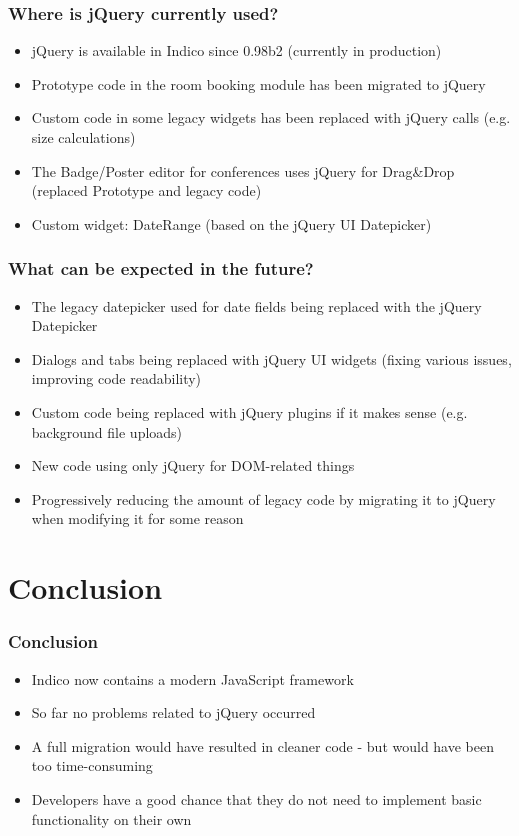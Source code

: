 \documentclass{beamer}
\begin{document}
\begin{frame}
  \frametitle{Where is jQuery currently used?}
  \begin{itemize}
    \item jQuery is available in Indico since 0.98b2 (currently in production)
    \item Prototype code in the room booking module has been migrated to jQuery
    \item Custom code in some legacy widgets has been replaced with jQuery calls (e.g. size calculations)
    \item The Badge/Poster editor for conferences uses jQuery for Drag\&Drop (replaced Prototype and
      legacy code)
    \item Custom widget: DateRange (based on the jQuery UI Datepicker)
  \end{itemize}

  \begin{center}
  \end{center}
\end{frame}

\begin{frame}
  \frametitle{What can be expected in the future?}
  \begin{itemize}
    \item The legacy datepicker used for date fields being replaced with the jQuery Datepicker
    \item Dialogs and tabs being replaced with jQuery UI widgets (fixing various issues, improving
      code readability)
    \item Custom code being replaced with jQuery plugins if it makes sense (e.g. background file
      uploads)
    \item New code using only jQuery for DOM-related things
    \item Progressively reducing the amount of legacy code by migrating it to jQuery when modifying
      it for some reason
  \end{itemize}
\end{frame}

\section{Conclusion}
\begin{frame}
  \frametitle{Conclusion}
  \begin{itemize}
    \item Indico now contains a modern JavaScript framework
    \item So far no problems related to jQuery occurred
    \item A full migration would have resulted in cleaner code - but would have been too time-consuming
    \item Developers have a good chance that they do not need to implement basic functionality on
      their own
  \end{itemize}
\end{frame}
\end{document}
